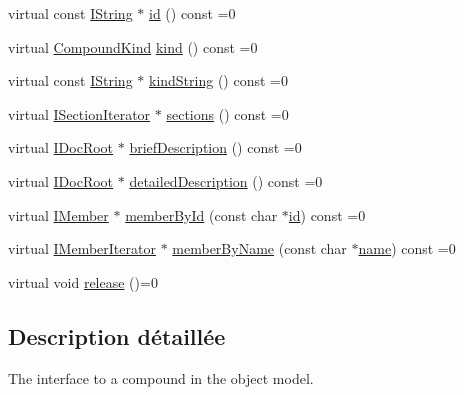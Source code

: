 \begin{DoxyCompactItemize}
virtual const \hyperlink{class_i_string}{I\+String} $\ast$ \hyperlink{class_i_compound_adcf419960af1fe868da64bc7481714fb}{id} () const  =0
\item 
virtual \hyperlink{class_i_compound_a6b86be2ca9f6759434c1dd8405be328a}{Compound\+Kind} \hyperlink{class_i_compound_a0fa87b43812418e64a0a82d64a6cc57f}{kind} () const  =0
\item 
virtual const \hyperlink{class_i_string}{I\+String} $\ast$ \hyperlink{class_i_compound_a60e893801397020e7bee2b6ddffcff59}{kind\+String} () const  =0
\item 
virtual \hyperlink{class_i_section_iterator}{I\+Section\+Iterator} $\ast$ \hyperlink{class_i_compound_aa94295e3ba675c026da25565a5e619da}{sections} () const  =0
\item 
virtual \hyperlink{class_i_doc_root}{I\+Doc\+Root} $\ast$ \hyperlink{class_i_compound_aff3daafa3d304da9730fd9b58d8160b1}{brief\+Description} () const  =0
\item 
virtual \hyperlink{class_i_doc_root}{I\+Doc\+Root} $\ast$ \hyperlink{class_i_compound_a276eb18a53d20f9d2211a66df8eb7703}{detailed\+Description} () const  =0
\item 
virtual \hyperlink{class_i_member}{I\+Member} $\ast$ \hyperlink{class_i_compound_a6d697b389c2638b1e092acc117cda382}{member\+By\+Id} (const char $\ast$\hyperlink{class_i_compound_adcf419960af1fe868da64bc7481714fb}{id}) const  =0
\item 
virtual \hyperlink{class_i_member_iterator}{I\+Member\+Iterator} $\ast$ \hyperlink{class_i_compound_abd4cc0d9bd8aa607abe439a82e3c5d7a}{member\+By\+Name} (const char $\ast$\hyperlink{class_i_compound_aaba330144c2c9d424505765f2ff94195}{name}) const  =0
\item 
virtual void \hyperlink{class_i_compound_a5388c74d390323ce610f752a01456b21}{release} ()=0
\end{DoxyCompactItemize}


\subsection{Description détaillée}
The interface to a compound in the object model. 

